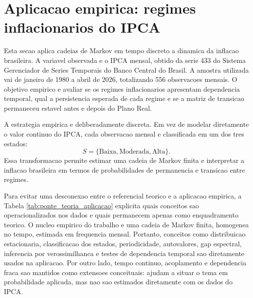 \section{Aplicacao empirica: regimes inflacionarios do IPCA}

Esta secao aplica cadeias de Markov em tempo discreto a dinamica da inflacao brasileira. A variavel observada e o IPCA mensal, obtido da serie 433 do Sistema Gerenciador de Series Temporais do Banco Central do Brasil. A amostra utilizada vai de janeiro de 1980 a abril de 2026, totalizando 556 observacoes mensais. O objetivo empirico e avaliar se os regimes inflacionarios apresentam dependencia temporal, qual a persistencia esperada de cada regime e se a matriz de transicao permaneceu estavel antes e depois do Plano Real.

A estrategia empirica e deliberadamente discreta. Em vez de modelar diretamente o valor continuo do IPCA, cada observacao mensal e classificada em um dos tres estados:
\[
S=\{\text{Baixa},\text{Moderada},\text{Alta}\}.
\]
Essa transformacao permite estimar uma cadeia de Markov finita e interpretar a inflacao brasileira em termos de probabilidades de permanencia e transicao entre regimes.

Para evitar uma desconexao entre o referencial teorico e a aplicacao empirica, a Tabela \ref{tab:ponte_teoria_aplicacao} explicita quais conceitos sao operacionalizados nos dados e quais permanecem apenas como enquadramento teorico. O nucleo empirico do trabalho e uma cadeia de Markov finita, homogenea no tempo, estimada em frequencia mensal. Portanto, conceitos como distribuicao estacionaria, classificacao dos estados, periodicidade, autovalores, gap espectral, inferencia por verossimilhanca e testes de dependencia temporal sao diretamente usados na aplicacao. Por outro lado, tempo continuo, acoplamento e dependencia fraca sao mantidos como extensoes conceituais: ajudam a situar o tema em probabilidade aplicada, mas nao sao estimados diretamente com os dados do IPCA.

